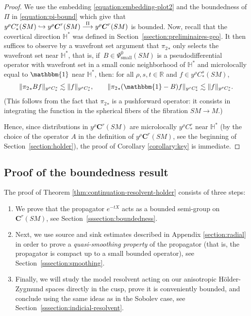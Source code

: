 \documentclass[JEP,XML,SOM,Unicode,NoFloatCountersInSection]{cedram}
\newcommand\hto{\mathrel{\lhook\joinrel\to}}
\newcommand{\bC}{\boldsymbol{C}}
\newcommand{\R}{\mathbb{R}}
\newcommand{\HH}{\mathbb{H}}
\theoremstyle{plain}
\theoremstyle{definition}
\begin{document}
\begin{proof}
We use the embedding \eqref{equation:embedding-plot2} and the boundedness of $\Pi$ in \eqref{equation:pi-bound} which give that $y^\rho C^r_*(SM) \hto y^\rho \bC^r(SM) \overset{\Pi}{\longrightarrow} y^\rho \bC^r(SM)$ is bounded. Now, recall that the covertical direction $\HH^*$ was defined in Section~\ref{ssection:preliminaires-geo}. It then suffices to observe by a wavefront set argument that ${\pi_2}_*$ only selects the wavefront set near $\HH^*$, that is, if~$B \in \Psi^0_{\mathrm{small}}(SM)$ is a pseudodifferential operator with wavefront set in a small conic neighborhood of $\HH^*$ and microlocally equal to $\mathbbm{1}$ near $\HH^*$, then: for all $\rho, s, t \in \R$ and $f \in y^\rho C^s_*(SM)$,
\begin{equation}
\label{equation:smoothing-integration}
\|{\pi_2}_*Bf\|_{y^\rho C^s_*} \lesssim \|f\|_{y^\rho C^s_*}, \qquad \|{\pi_2}_*(\mathbbm{1}-B)f\|_{y^\rho C^t_*} \lesssim \|f\|_{y^\rho C^{s}_*}.
\end{equation}
{\color{black}(This follows from the fact that ${\pi_2}_*$ is a pushforward operator: it consists in integrating the function in the spherical fibers of the fibration $SM \to M$.)}

Hence, since distributions in $y^\rho \bC^r(SM)$ are microlocally $y^\rho C^r_*$ near $\HH^*$ (by the choice of the operator $A$ in the definition of $y^\rho \bC^r(SM)$, see the beginning of Section~\ref{section:holder}), the proof of Corollary \ref{corollary:key} is immediate.
\end{proof}

\subsection{Proof of the boundedness result}

\label{ssection:proof-holder}

The proof of Theorem \ref{thm:continuation-resolvent-holder} consists of three steps:
\begin{enumerate}
\item We prove that the propagator $e^{-tX}$ acts as a bounded semi-group on $\bC^r(SM)$, see Section~\ref{sssection:boundedness}.
\item Next, we use source and sink estimates described in Appendix \ref{section:radial} in order to prove a \emph{quasi-smoothing property} of the propagator (that is, the propagator is compact up to a small bounded operator), see Section~\ref{sssection:smoothing}.
\item Finally, we will study the model resolvent acting on our anisotropic H\"older-Zygmund spaces directly in the cusp, prove it is conveniently bounded, and conclude using the same ideas as in the Sobolev case, see Section~\ref{sssection:indicial-resolvent}.
\end{enumerate}
\end{document}
